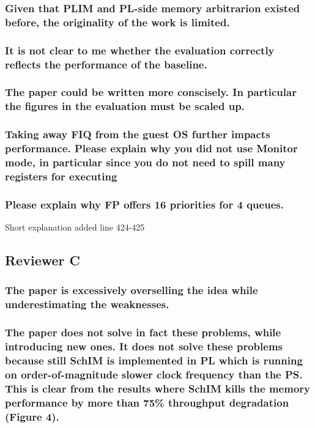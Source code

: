         \subsubsection{Given that PLIM and PL-side memory arbitrarion existed before, the originality of the work is limited.}


        \subsubsection{It is not clear to me whether the evaluation correctly reflects the performance of the baseline.}


        \subsubsection{The paper could be written more conscisely. In particular the figures in the evaluation must be scaled up.}


        \subsubsection{Taking away FIQ from the guest OS further impacts performance. Please explain why you did not use Monitor mode, in particular since you do not need to spill many registers for executing}


        \subsubsection{Please explain why FP offers 16 priorities for 4 queues.}
            Short explanation added line 424-425

    \subsection{Reviewer C}
        \subsubsection{The paper is excessively overselling the idea while underestimating the weaknesses.}


        \subsubsection{The paper does not solve in fact these problems, while introducing new ones. It does not solve these problems because still SchIM is implemented in PL which is running on order-of-magnitude slower clock frequency than the PS. This is clear from the results where SchIM kills the memory performance by more than 75\% throughput degradation (Figure 4).}


